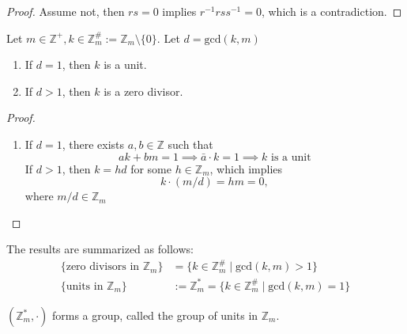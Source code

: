\begin{proof}
Assume not, then $rs=0$ implies $r^{-1}rss^{-1}=0$, which is a contradiction.
\end{proof}
\begin{proposition}
Let $m\in\mathbb{Z}^+,k\in\mathbb{Z}_m^{\#}:=\mathbb{Z}_m\setminus\{0\}$. Let $d=\mbox{gcd}(k,m)$
\begin{enumerate}
\item
If $d=1$, then $k$ is a unit.
\item
If $d>1$, then $k$ is a zero divisor.
\end{enumerate}
\end{proposition}
\begin{proof}
\begin{enumerate}
\item
If $d=1$, there exists $a,b\in\mathbb{Z}$ such that
\[
ak+bm=1\implies \bar{a}\cdot k=1\implies\mbox{$k$ is a unit}
\]
If $d>1$, then $k=hd$ for some $h\in\mathbb{Z}_m$, which implies
\[
k\cdot(m/d)=hm=0,
\]
where $m/d\in\mathbb{Z}_m$
\end{enumerate}
\end{proof}
The results are summarized as follows:
\begin{align*}
\{\mbox{zero divisors in }\mathbb{Z}_m\}&=\{k\in\mathbb{Z}_m^{\#}\mid\mbox{gcd}(k,m)>1\}\\
\{\mbox{units in }\mathbb{Z}_m\}&:=\mathbb{Z}_m^*=\{k\in\mathbb{Z}_m^{\#}\mid\mbox{gcd}(k,m)=1\}
\end{align*}
\begin{proposition}
$(\mathbb{Z}_m^*,\cdot)$ forms a group, called the group of units in $\mathbb{Z}_m$.
\end{proposition}


